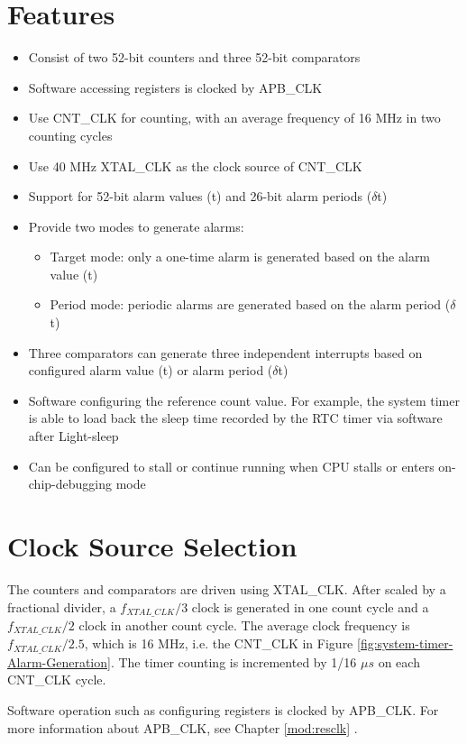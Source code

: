 \documentclass[main\_\_EN.tex]{subfiles}
\begin{document}
\section{Features}
\begin{itemize}
    \item Consist of two 52-bit counters and three 52-bit comparators
    \item Software accessing registers is clocked by APB\_CLK
    \item Use CNT\_CLK for counting, with an average frequency of 16 MHz in two counting cycles
    \item Use 40 MHz XTAL\_CLK as the clock source of CNT\_CLK
    \item Support for 52-bit alarm values (t) and 26-bit alarm periods ($\delta$t)
    \item Provide two modes to generate alarms:
    \begin{itemize}
        \item Target mode: only a one-time alarm is generated based on the alarm value (t)
        \item Period mode: periodic alarms are generated based on the alarm period ($\delta$t)
    \end{itemize}
    \item Three comparators can generate three independent interrupts based on configured alarm value (t) or alarm period ($\delta$t)
    \item Software configuring the reference count value. For example, the system timer is able to load back the sleep time recorded by the RTC timer via software after Light-sleep
    \item Can be configured to stall or continue running when CPU stalls or enters on-chip-debugging mode
\end{itemize}


\section{Clock Source Selection}
The counters and comparators are driven using XTAL\_CLK. After scaled by a fractional divider, a $f_{XTAL\_CLK}/3$ clock is generated in one count cycle and a $f_{XTAL\_CLK}/2$ clock in another count cycle. The average clock frequency is $f_{XTAL\_CLK}/2.5$, which is 16 MHz, i.e. the CNT\_CLK in Figure \ref{fig:system-timer-Alarm-Generation}. The timer counting is incremented by 1/16 $\mu s$ on each CNT\_CLK cycle.

Software operation such as configuring registers is clocked by APB\_CLK. For more information about APB\_CLK, see Chapter \ref{mod:resclk} \textit{}.
\end{document}
